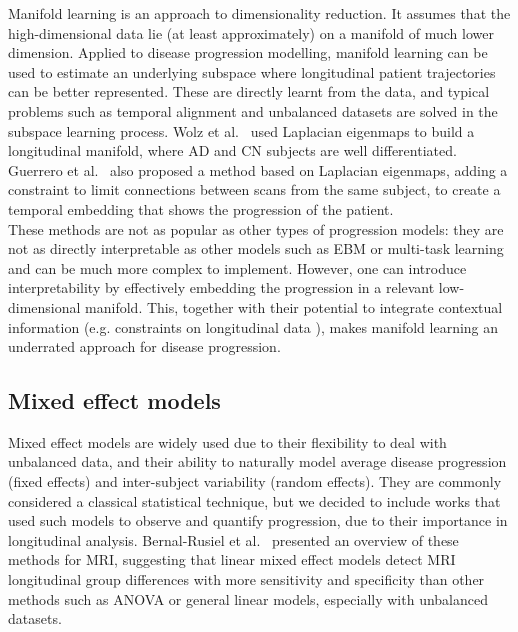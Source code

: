 Manifold learning is an approach to dimensionality reduction. It assumes that the high-dimensional data lie (at least approximately) on a manifold of much lower dimension. Applied to disease progression modelling, manifold learning can be used to estimate an underlying subspace where longitudinal patient trajectories can be better represented. These are directly learnt from the data, and typical problems such as temporal alignment and unbalanced datasets are solved in the subspace learning process. Wolz et al.\ \cite{Wolz2010} used Laplacian eigenmaps to build a longitudinal manifold, where AD and CN subjects are well differentiated. Guerrero et al.\ \cite{Guerrero2015,guerrero} also proposed a method based on Laplacian eigenmaps, adding a constraint to limit connections between scans from the same subject, to create a temporal embedding that shows the progression of the patient. \\

These methods are not as popular as other types of progression models: they are not as directly interpretable as other models such as EBM or multi-task learning and can be much more complex to implement. However, one can introduce interpretability by effectively embedding the progression in a relevant low-dimensional manifold. This, together with their potential to integrate contextual information (e.g. constraints on longitudinal data \cite{Guerrero2015}), makes manifold learning an underrated approach for disease progression.

\subsection{Mixed effect models}

Mixed effect models are widely used due to their flexibility to deal with unbalanced data, and their ability to naturally model average disease progression (fixed effects) and inter-subject variability (random effects). They are commonly considered a classical statistical technique, but we decided to include works that used such models to observe and quantify progression, due to their importance in longitudinal analysis. Bernal-Rusiel et al.\ \cite{Bernal-Rusiel2013} presented an overview of these methods for MRI, suggesting that linear mixed effect models detect MRI longitudinal group differences with more sensitivity and specificity than other methods such as ANOVA or general linear models, especially with unbalanced datasets. \\

